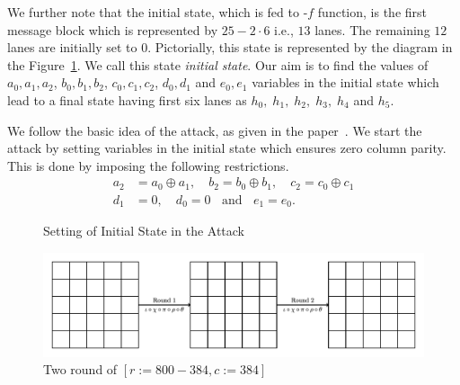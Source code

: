 We further note that the initial state, which is fed to \KECCAK-$f$ function, is the first message block which is represented by $25-2\cdot 6$ i.e., $13$ lanes. The remaining $12$ lanes are initially set to $0$. Pictorially, this state is represented by the diagram in the Figure~\ref{initial_state}. We call this state \emph{initial state}.
Our aim is to find the values of $a_0, a_1, a_2$, $b_0, b_1, b_2$, $c_0, c_1, c_2$, $d_0, d_1$ and $e_0, e_1$ variables in the initial state which lead to a final state having first six lanes as $h_0,\;h_1,\;h_2,\;h_3,\;h_4$ and $h_5$. 

We follow the basic idea of the attack, as given in the paper~\cite{naya2011practical}.
We start the attack by setting variables in the initial state which ensures zero column parity. 
This is done by imposing the following restrictions.
\begin{align}\nonumber
a_2 &= a_0 \oplus a_1,\quad b_2 = b_0 \oplus b_1, \quad c_2 = c_0 \oplus c_1\\ \label{cond_state1}
d_1 & = 0,\quad d_0 = 0\;\;\text{ and }\;\; e_1 = e_0. 
\end{align}

\begin{figure}
\begin{center}
\end{center}
\caption{Setting of Initial State in the Attack\label{initial_state}}
\end{figure}

\begin{figure}[H]
    \centering
    \includegraphics[scale=0.7]{keccak2Rstate.pdf}
    \caption{Two round of \KECCAK$[r:=800-384, c:=384]$}
    \label{two_rnd}
\end{figure}

